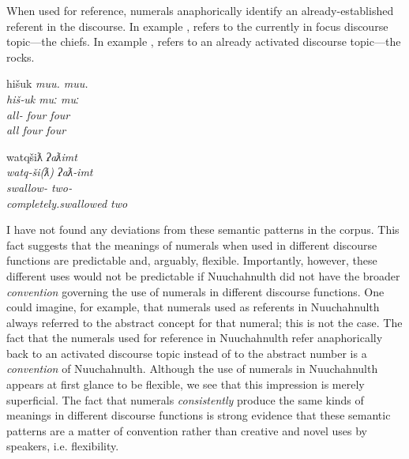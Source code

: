 \noindent When used for reference, numerals anaphorically identify an already-established referent in the discourse. In example ,   refers to the currently in focus discourse topic—the chiefs. In example ,   refers to an already activated discourse topic—the rocks.

\begin{exe}
  \ex\label{ex:4.3}
  \begin{xlist}

    \ex\label{ex:4.3a}
    \gllll hišuk        \em{muu}. muu.\\
           hiš‑uk       \em{muː}  muː\\
           all‑ \em{four} four\\
           all          \em{four} four\\

    \ex\label{ex:4.3b}
    \gllll watqšiƛ              \em{ʔaƛimt}\\
           watq‑ši(ƛ)           \em{ʔaƛ‑imt}\\
           swallow‑     \em{two‑}\\
           completely.swallowed \em{two}\\

  \end{xlist}
\end{exe}

I have not found any deviations from these semantic patterns in the corpus. This fact suggests that the meanings of numerals when used in different discourse functions are predictable and, arguably, flexible. Importantly, however, these different uses would not be predictable if Nuuchahnulth did not have the broader \emph{convention} governing the use of numerals in different discourse functions. One could imagine, for example, that numerals used as referents in Nuuchahnulth always referred to the abstract concept for that numeral; this is not the case. The fact that the numerals used for reference in Nuuchahnulth refer anaphorically back to an activated discourse topic instead of to the abstract number is a \emph{convention} of Nuuchahnulth. Although the use of numerals in Nuuchahnulth appears at first glance to be flexible, we see that this impression is merely superficial. The fact that numerals \emph{consistently} produce the same kinds of meanings in different discourse functions is strong evidence that these semantic patterns are a matter of convention rather than creative and novel uses by speakers, i.e. flexibility.

